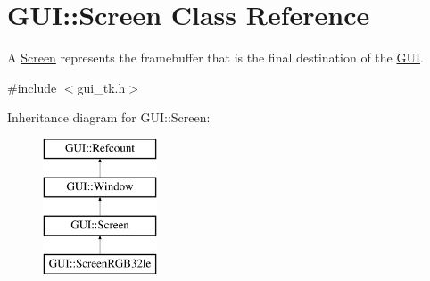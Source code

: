 \hypertarget{classGUI_1_1Screen}{\section{G\-U\-I\-:\-:Screen Class Reference}
\label{classGUI_1_1Screen}
}


A \hyperlink{classGUI_1_1Screen}{Screen} represents the framebuffer that is the final destination of the \hyperlink{namespaceGUI}{G\-U\-I}.  




{\ttfamily \#include $<$gui\-\_\-tk.\-h$>$}

Inheritance diagram for G\-U\-I\-:\-:Screen\-:\begin{figure}[H]
\begin{center}
\leavevmode
\includegraphics[height=4.000000cm]{classGUI_1_1Screen}
\end{center}
\end{figure}
